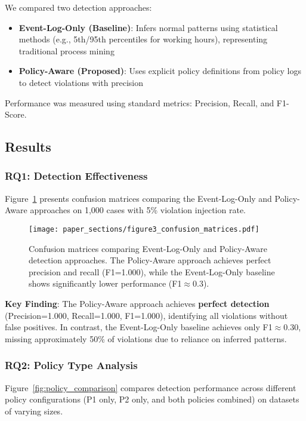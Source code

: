 We compared two detection approaches:

\begin{itemize}
    \item \textbf{Event-Log-Only (Baseline)}: Infers normal patterns using statistical methods (e.g., 5th/95th percentiles for working hours), representing traditional process mining
    \item \textbf{Policy-Aware (Proposed)}: Uses explicit policy definitions from policy logs to detect violations with precision
\end{itemize}

Performance was measured using standard metrics: Precision, Recall, and F1-Score.

\subsection{Results}

\subsubsection{RQ1: Detection Effectiveness}

Figure~\ref{fig:confusion_matrices} presents confusion matrices comparing the Event-Log-Only and Policy-Aware approaches on 1,000 cases with 5\% violation injection rate.

\begin{figure}[htbp]
    \centering
    \texttt{[image: paper\_sections/figure3\_confusion\_matrices.pdf]}
    \caption{Confusion matrices comparing Event-Log-Only and Policy-Aware detection approaches. The Policy-Aware approach achieves perfect precision and recall (F1=1.000), while the Event-Log-Only baseline shows significantly lower performance (F1$\approx$0.3).}
    \label{fig:confusion_matrices}
\end{figure}

\textbf{Key Finding}: The Policy-Aware approach achieves \textbf{perfect detection} (Precision=1.000, Recall=1.000, F1=1.000), identifying all violations without false positives. In contrast, the Event-Log-Only baseline achieves only F1$\approx$0.30, missing approximately 50\% of violations due to reliance on inferred patterns.

\subsubsection{RQ2: Policy Type Analysis}

Figure~\ref{fig:policy_comparison} compares detection performance across different policy configurations (P1 only, P2 only, and both policies combined) on datasets of varying sizes.

